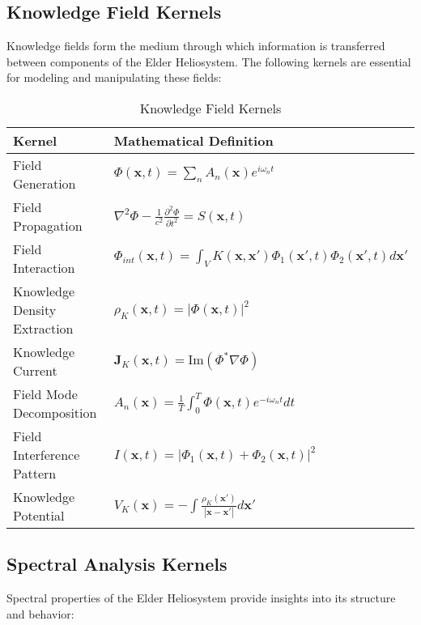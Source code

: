 \subsection{Knowledge Field Kernels}

Knowledge fields form the medium through which information is transferred between components of the Elder Heliosystem. The following kernels are essential for modeling and manipulating these fields:

\begin{table}[h]
\centering
\small
\caption{Knowledge Field Kernels}
\label{tab:field_kernels}
\begin{tabular}{|p{5cm}|p{9cm}|}
\hline
\textbf{Kernel} & \textbf{Mathematical Definition} \\
\hline
Field Generation & $\Phi(\mathbf{x}, t) = \sum_n A_n(\mathbf{x}) e^{i\omega_n t}$ \\
\hline
Field Propagation & $\nabla^2\Phi - \frac{1}{c^2}\frac{\partial^2\Phi}{\partial t^2} = S(\mathbf{x}, t)$ \\
\hline
Field Interaction & $\Phi_{int}(\mathbf{x}, t) = \int_V K(\mathbf{x}, \mathbf{x}') \Phi_1(\mathbf{x}', t) \Phi_2(\mathbf{x}', t) d\mathbf{x}'$ \\
\hline
Knowledge Density Extraction & $\rho_K(\mathbf{x}, t) = |\Phi(\mathbf{x}, t)|^2$ \\
\hline
Knowledge Current & $\mathbf{J}_K(\mathbf{x}, t) = \text{Im}(\Phi^*\nabla\Phi)$ \\
\hline
Field Mode Decomposition & $A_n(\mathbf{x}) = \frac{1}{T}\int_0^T \Phi(\mathbf{x}, t) e^{-i\omega_n t} dt$ \\
\hline
Field Interference Pattern & $I(\mathbf{x}, t) = |\Phi_1(\mathbf{x}, t) + \Phi_2(\mathbf{x}, t)|^2$ \\
\hline
Knowledge Potential & $V_K(\mathbf{x}) = -\int \frac{\rho_K(\mathbf{x}')}{|\mathbf{x} - \mathbf{x}'|} d\mathbf{x}'$ \\
\hline
\end{tabular}
\end{table}

\subsection{Spectral Analysis Kernels}

Spectral properties of the Elder Heliosystem provide insights into its structure and behavior:

